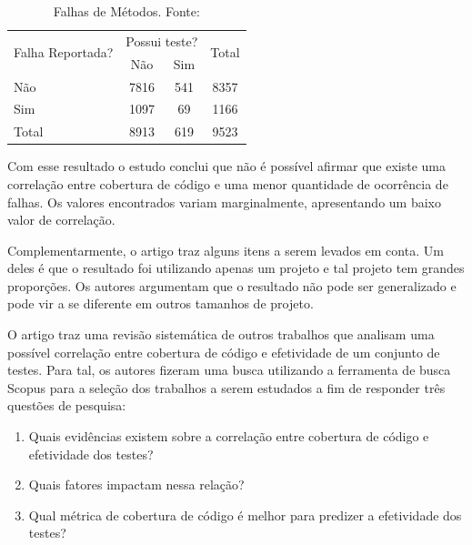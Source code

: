 \documentclass[11.5pt]{article}
\begin{document}
\begin{table}[ht]
\centering
\caption{Falhas de Métodos. Fonte: \cite{unitTestedCrash}}
\label{tab:FalhasMetodosTeste}
\begin{tabular}{|l|c|c|c|}
\hline
\multirow{2}{*}{Falha Reportada?} & \multicolumn{2}{c|}{Possui teste?} & \multirow{2}{*}{Total} \\ \cline{2-3}
                                  & Não   & Sim                        &       \\ \hline
Não                               & 7816  & 541                        & 8357  \\ \hline
Sim                               & 1097  &  69                        & 1166  \\ \hline
Total                             & 8913  & 619                        & 9523  \\ \hline
\end{tabular}
\end{table}

Com esse resultado o estudo conclui que não é possível afirmar que existe uma correlação entre
cobertura de código e uma menor quantidade de ocorrência de falhas. Os valores encontrados variam
marginalmente, apresentando um baixo valor de correlação.

Complementarmente, o artigo traz alguns itens a serem levados em conta.
Um deles é que o resultado foi utilizando apenas um projeto e tal projeto tem grandes proporções.
Os autores argumentam que o resultado não pode ser generalizado e pode vir a se diferente em outros
tamanhos de projeto.

O artigo \cite{coverageMetaAnalysis} traz uma revisão sistemática de outros trabalhos que analisam
uma possível correlação entre cobertura de código e efetividade de um conjunto de testes.
Para tal, os autores fizeram uma busca utilizando a ferramenta de busca Scopus para a seleção dos
trabalhos a serem estudados a fim de responder três questões de pesquisa:
\begin{enumerate}
    \item Quais evidências existem sobre a correlação entre cobertura de código e efetividade dos
          testes?

    \item Quais fatores impactam nessa relação?

    \item Qual métrica de cobertura de código é melhor para predizer a efetividade dos testes?
\end{enumerate}
\end{document}
